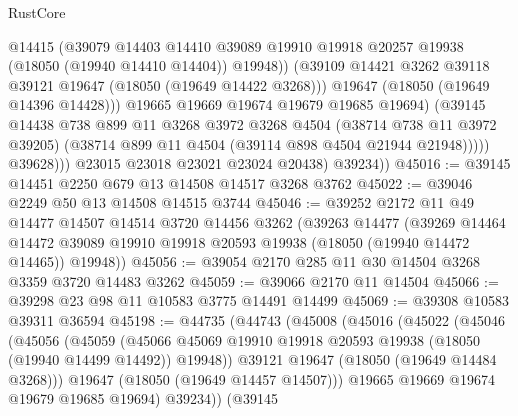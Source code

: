 \begin{lexlean}{RustCore}
\begin{coremodule}
                          @14415
                          (@39079
                            @14403
                            @14410
                            @39089
                            @19910
                            @19918
                            @20257
                            @19938
                            (@18050 (@19940 @14410 @14404))
                            @19948))
                        (@39109 @14421 @3262 @39118 @39121 @19647 (@18050 (@19649 @14422 @3268)))
                        @19647
                        (@18050 (@19649 @14396 @14428)))
                      @19665
                      @19669
                      @19674
                      @19679
                      @19685
                      @19694)
                    (@39145
                      @14438
                      @738
                      @899
                      @11
                      @3268
                      @3972
                      @3268
                      @4504
                      (@38714 @738 @11 @3972 @39205)
                      (@38714 @899 @11 @4504 (@39114 @898 @4504 @21944 @21948)))))
                @39628)))
          @23015
          @23018
          @23021
          @23024
          @20438)
        @39234))
@45016 := @39145 @14451 @2250 @679 @13 @14508 @14517 @3268 @3762
@45022 := @39046 @2249 @50 @13 @14508 @14515 @3744
@45046 := @39252
    @2172
    @11
    @49
    @14477
    @14507
    @14514
    @3720
    @14456
    @3262
    (@39263
      @14477
      (@39269
        @14464
        @14472
        @39089
        @19910
        @19918
        @20593
        @19938
        (@18050 (@19940 @14472 @14465))
        @19948))
@45056 := @39054 @2170 @285 @11 @30 @14504 @3268 @3359 @3720 @14483 @3262
@45059 := @39066 @2170 @11 @14504
@45066 := @39298 @23 @98 @11 @10583 @3775 @14491 @14499
@45069 := @39308 @10583 @39311 @36594
@45198 := @44735
    (@44743
      (@45008
        (@45016
          (@45022
            (@45046
              (@45056
                (@45059
                  (@45066
                    @45069
                    @19910
                    @19918
                    @20593
                    @19938
                    (@18050 (@19940 @14499 @14492))
                    @19948))
                @39121
                @19647
                (@18050 (@19649 @14484 @3268)))
              @19647
              (@18050 (@19649 @14457 @14507)))
            @19665
            @19669
            @19674
            @19679
            @19685
            @19694)
          @39234))
      (@39145

\end{coremodule}
\end{lexlean}
